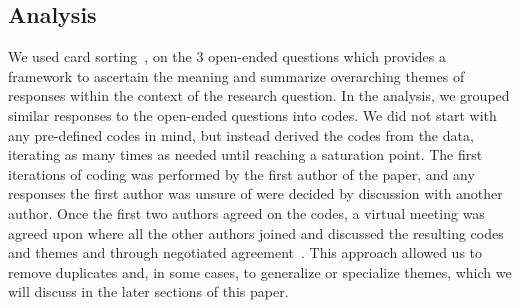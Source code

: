 \subsection{Analysis}
\label{sec:card_sorting}


We used card sorting~\cite{zimmermann2016card}, on the 3 open-ended questions which provides a framework to ascertain the meaning and summarize overarching themes of responses within the context of the research question. In the analysis, we grouped similar responses to the open-ended questions into codes. We did not start with any pre-defined codes in mind, but instead derived the codes from the data, iterating as many times as needed until reaching a saturation point. The first iterations of coding was performed by the first author of the paper, and any responses the first author was unsure of were decided by discussion with another author. Once the first two authors agreed on the codes, a virtual meeting was agreed upon where all the other authors joined and discussed the resulting codes and themes and through negotiated agreement~\cite{Garrison:2006}. This approach allowed us to remove duplicates and, in some cases, to generalize or specialize themes, which we will discuss in the later sections of this paper.
